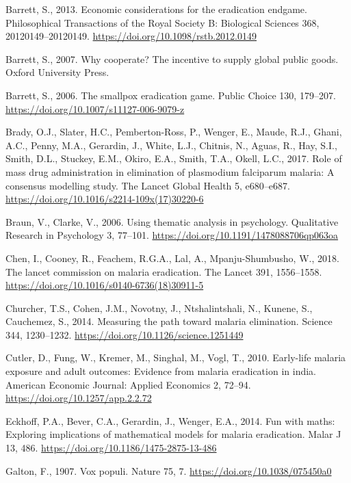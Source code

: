 \documentclass[]{article}
\begin{document}
\hypertarget{ref-Barrett2013}{}
Barrett, S., 2013. Economic considerations for the eradication endgame.
Philosophical Transactions of the Royal Society B: Biological Sciences
368, 20120149--20120149. \url{https://doi.org/10.1098/rstb.2012.0149}

\hypertarget{ref-barrett}{}
Barrett, S., 2007. Why cooperate? The incentive to supply global public
goods. Oxford University Press.

\hypertarget{ref-Barrett_2006}{}
Barrett, S., 2006. The smallpox eradication game. Public Choice 130,
179--207. \url{https://doi.org/10.1007/s11127-006-9079-z}

\hypertarget{ref-Brady2017}{}
Brady, O.J., Slater, H.C., Pemberton-Ross, P., Wenger, E., Maude, R.J.,
Ghani, A.C., Penny, M.A., Gerardin, J., White, L.J., Chitnis, N., Aguas,
R., Hay, S.I., Smith, D.L., Stuckey, E.M., Okiro, E.A., Smith, T.A.,
Okell, L.C., 2017. Role of mass drug administration in elimination of
plasmodium falciparum malaria: A consensus modelling study. The Lancet
Global Health 5, e680--e687.
\url{https://doi.org/10.1016/s2214-109x(17)30220-6}

\hypertarget{ref-Braun2006}{}
Braun, V., Clarke, V., 2006. Using thematic analysis in psychology.
Qualitative Research in Psychology 3, 77--101.
\url{https://doi.org/10.1191/1478088706qp063oa}

\hypertarget{ref-Chen2018}{}
Chen, I., Cooney, R., Feachem, R.G.A., Lal, A., Mpanju-Shumbusho, W.,
2018. The lancet commission on malaria eradication. The Lancet 391,
1556--1558. \url{https://doi.org/10.1016/s0140-6736(18)30911-5}

\hypertarget{ref-Churcher_2014}{}
Churcher, T.S., Cohen, J.M., Novotny, J., Ntshalintshali, N., Kunene,
S., Cauchemez, S., 2014. Measuring the path toward malaria elimination.
Science 344, 1230--1232. \url{https://doi.org/10.1126/science.1251449}

\hypertarget{ref-Cutler_2010}{}
Cutler, D., Fung, W., Kremer, M., Singhal, M., Vogl, T., 2010.
Early-life malaria exposure and adult outcomes: Evidence from malaria
eradication in india. American Economic Journal: Applied Economics 2,
72--94. \url{https://doi.org/10.1257/app.2.2.72}

\hypertarget{ref-Eckhoff2014}{}
Eckhoff, P.A., Bever, C.A., Gerardin, J., Wenger, E.A., 2014. Fun with
maths: Exploring implications of mathematical models for malaria
eradication. Malar J 13, 486.
\url{https://doi.org/10.1186/1475-2875-13-486}

\hypertarget{ref-Galton1907Voxpopuli}{}
Galton, F., 1907. Vox populi. Nature 75, 7.
\url{https://doi.org/10.1038/075450a0}
\end{document}
